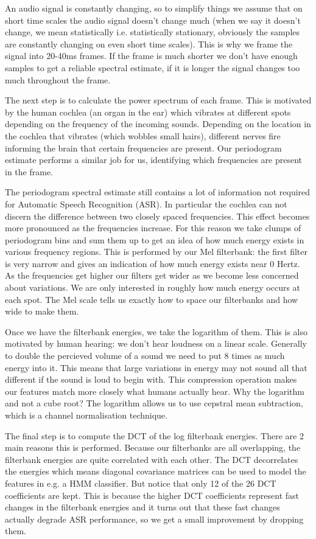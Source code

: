 An audio signal is constantly changing, so to simplify things we assume that on short time scales the audio signal doesn't change much (when we say it doesn't change, we mean statistically i.e. statistically stationary, obviously the samples are constantly changing on even short time scales). This is why we frame the signal into 20-40ms frames. If the frame is much shorter we don't have enough samples to get a reliable spectral estimate, if it is longer the signal changes too much throughout the frame.

The next step is to calculate the power spectrum of each frame. This is motivated by the human cochlea (an organ in the ear) which vibrates at different spots depending on the frequency of the incoming sounds. Depending on the location in the cochlea that vibrates (which wobbles small hairs), different nerves fire informing the brain that certain frequencies are present. Our periodogram estimate performs a similar job for us, identifying which frequencies are present in the frame.

The periodogram spectral estimate still contains a lot of information not required for Automatic Speech Recognition (ASR). In particular the cochlea can not discern the difference between two closely spaced frequencies. This effect becomes more pronounced as the frequencies increase. For this reason we take clumps of periodogram bins and sum them up to get an idea of how much energy exists in various frequency regions. This is performed by our Mel filterbank: the first filter is very narrow and gives an indication of how much energy exists near 0 Hertz. As the frequencies get higher our filters get wider as we become less concerned about variations. We are only interested in roughly how much energy occurs at each spot. The Mel scale tells us exactly how to space our filterbanks and how wide to make them. 

Once we have the filterbank energies, we take the logarithm of them. This is also motivated by human hearing: we don't hear loudness on a linear scale. Generally to double the percieved volume of a sound we need to put 8 times as much energy into it. This means that large variations in energy may not sound all that different if the sound is loud to begin with. This compression operation makes our features match more closely what humans actually hear. Why the logarithm and not a cube root? The logarithm allows us to use cepstral mean subtraction, which is a channel normalisation technique.

The final step is to compute the DCT of the log filterbank energies. There are 2 main reasons this is performed. Because our filterbanks are all overlapping, the filterbank energies are quite correlated with each other. The DCT decorrelates the energies which means diagonal covariance matrices can be used to model the features in e.g. a HMM classifier. But notice that only 12 of the 26 DCT coefficients are kept. This is because the higher DCT coefficients represent fast changes in the filterbank energies and it turns out that these fast changes actually degrade ASR performance, so we get a small improvement by dropping them.

